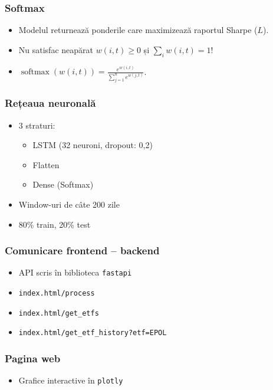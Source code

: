 \documentclass[notheorems]{beamer}
\theoremstyle{definition}
\begin{document}
\begin{frame}
\frametitle{Softmax}
\begin{itemize}
    \item<1-> Modelul returnează ponderile care maximizează raportul Sharpe ($L$).
    \item<2-> Nu satisfac neapărat $w(i, t) \ge 0$ și $\displaystyle \sum_i w(i,t) = 1$!
    \item<3-> $\displaystyle \operatorname{softmax}(w(i, t)) = \frac{e^{w(i, t)}}{\sum\limits_{j=1}^n e^{w(j, t)}}$.
\end{itemize}
\end{frame}

\begin{frame}
\frametitle{Rețeaua neuronală}
\begin{itemize}
    \item<2-> 3 straturi:
    \begin{itemize}
        \item<3-> LSTM (32 neuroni, dropout: 0,2)
        \item<4-> Flatten
        \item<5-> Dense (Softmax)
    \end{itemize}
    \item<6-> Window-uri de câte 200 zile
    \item<7-> 80\% train, 20\% test
\end{itemize}
\end{frame}

\begin{frame}
\frametitle{Comunicare frontend -- backend}
\begin{itemize}
    \item<1-> API scris în biblioteca \texttt{fastapi}
    \item<2-> \texttt{index.html/process}
    \item<3-> \texttt{index.html/get\_etfs}
    \item<4-> \texttt{index.html/get\_etf\_history?etf=EPOL}
\end{itemize}
\end{frame}

\begin{frame}
\frametitle{Pagina web}
\begin{itemize}
    \item Grafice interactive în \texttt{plotly}
\end{itemize}
\end{frame}
\end{document}
